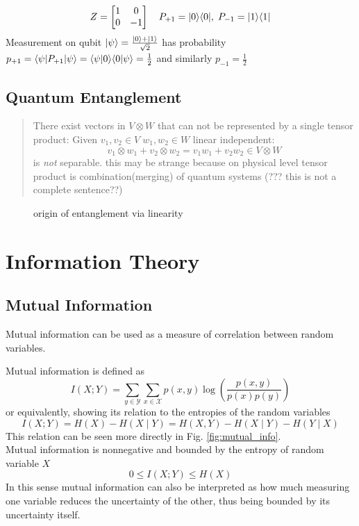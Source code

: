 			\begin{xmpl}
      \begin{equation*} %
				Z = \begin{bmatrix} 1 & 0 \\ 0 & -1 \end{bmatrix} \quad P_{+1} = \proj{0} , \; P_{-1} = \proj{1}
      \end{equation*}
				Measurement on qubit $ |\psi \rangle = \frac{|0 \rangle + |1 \rangle}{\sqrt{2}} $ has probability $p_{+1} = \langle \psi|P_{+1}|\psi \rangle = \langle\psi|0\rangle\langle0|\psi\rangle = \frac{1}{2}$ and similarly $p_{-1} = \frac{1}{2}$
				\cite{NC10}
			\end{xmpl}

		\subsection{Quantum Entanglement}
		\begin{quotation}
		There exist vectors in $V\otimes W$ that can not be represented by a single tensor product:
		Given $v_1,v_2\in V \; w_1,w_2\in W$ linear independent:
    \begin{equation*}
		v_1\otimes w_1 + v_2\otimes w_2 = v_1w_1 + v_2w_2 \in V\otimes W
    \end{equation*}
    is \emph{not} separable.
		this may be strange because on physical level tensor product is combination(merging) of quantum systems (??? this is not a complete sentence??)
		\end{quotation}
		\cite{Han13}
		
		\begin{figure}[h]
			\centering
			
			\caption{origin of entanglement via linearity}
		\end{figure}
	
\section{Information Theory}
	
	\subsection{Mutual Information}
	Mutual information can be used as a measure of correlation between random variables. 
	
	Mutual information is defined as
	$$ I(X;Y) = \sum_{y\in\mathcal{Y}}\sum_{x\in\mathcal{X}} p(x,y) \log\left(\frac{p(x,y)}{p(x)p(y)}\right) $$
	or equivalently, showing its relation to the entropies of the random variables
	$$ I(X;Y) = H(X) - H(X\mid Y) = H(X,Y) - H(X\mid Y) - H(Y\mid X) $$
	This relation can be seen more directly in Fig. \ref{fig:mutual_info}.\\
	Mutual information is nonnegative and bounded by the entropy of random variable $X$
	$$ 0 \leq I(X;Y) \leq H(X) $$
	In this sense mutual information can also be interpreted as how much measuring one variable reduces the uncertainty of the other, thus being bounded by its uncertainty itself.
	
